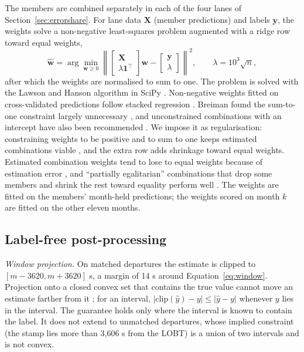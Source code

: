 \documentclass[
  manuscript=article,  %
  layout=preprint,  %
  year=20xx,
  volume=x,
]{extra/joas}
\begin{document}
The members are combined separately in each of the four lanes of Section~\ref{sec:errorshare}. For lane data $\mathbf{X}$ (member predictions) and labels $\mathbf{y}$, the weights solve a non-negative least-squares problem augmented with a ridge row toward equal weights,
\begin{equation}
\hat{\mathbf{w}} = \arg\min_{\mathbf{w} \geq 0} \left\| \begin{bmatrix} \mathbf{X} \\ \lambda \mathbf{1}^{\top} \end{bmatrix} \mathbf{w} - \begin{bmatrix} \mathbf{y} \\ \lambda \end{bmatrix} \right\|^2, \qquad \lambda = 10^3\sqrt{n},
\label{eq:blend}
\end{equation}
after which the weights are normalised to sum to one. The problem is solved with the Lawson and Hanson algorithm \cite{lawson1995solving} in SciPy \cite{virtanen2020scipy}. Non-negative weights fitted on cross-validated predictions follow stacked regression \cite{breiman1996stacked}. Breiman found the sum-to-one constraint largely unnecessary \cite{breiman1996stacked}, and unconstrained combinations with an intercept have also been recommended \cite{granger1984improved}. We impose it as regularisation: constraining weights to be positive and to sum to one keeps estimated combinations viable \cite{conflitti2015optimal}, and the extra row adds shrinkage toward equal weights. Estimated combination weights tend to lose to equal weights because of estimation error \cite{smith2009simple,claeskens2016forecast}, and ``partially egalitarian'' combinations that drop some members and shrink the rest toward equality perform well \cite{diebold2019machine}. The weights are fitted on the members' month-held predictions; the weights scored on month $k$ are fitted on the other eleven months.

\subsection{Label-free post-processing}
\label{sec:post}

\textit{Window projection.} On matched departures the estimate is clipped to $[m-3620, m+3620]$ s, a margin of 14 s around Equation~\eqref{eq:window}. Projection onto a closed convex set that contains the true value cannot move an estimate farther from it \cite{bauschke2017convex,panagiotelis2021forecast}; for an interval, $|\mathrm{clip}(\hat{y}) - y| \leq |\hat{y} - y|$ whenever $y$ lies in the interval. The guarantee holds only where the interval is known to contain the label. It does not extend to unmatched departures, whose implied constraint (the stamp lies more than 3,606 s from the LOBT) is a union of two intervals and is not convex.
\end{document}
